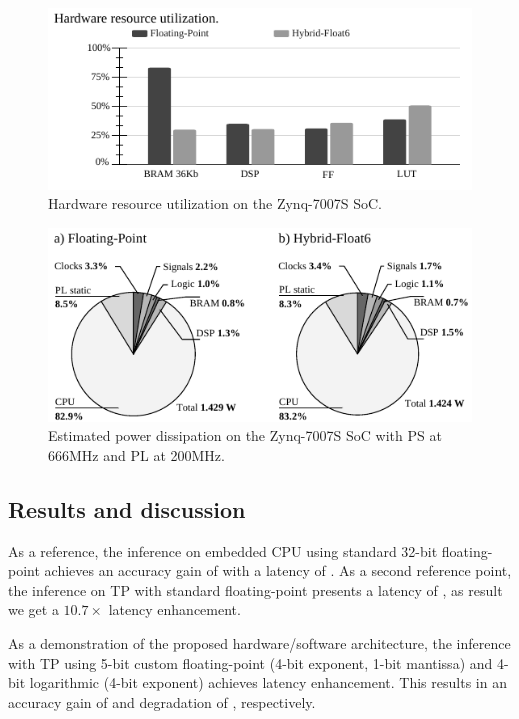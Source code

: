 \begin{figure}[t!]
	\centering
	\includegraphics[width=1\columnwidth]{../figures/power_breakdown/resource_utilization.pdf}
	\caption{Hardware resource utilization on the Zynq-7007S SoC.}
	\label{fig:resource_utilization}
\end{figure}

\begin{figure}[t!]
	\centering
	\includegraphics[width=1\columnwidth]{../figures/power_breakdown/power_breakdown.pdf}
	\caption{Estimated power dissipation on the Zynq-7007S SoC with PS at 666MHz and PL at 200MHz.}
	\label{fig:power}
\end{figure}

\subsection{Results and discussion}
As a reference, the inference on embedded CPU using standard 32-bit floating-point achieves an accuracy gain of  with a latency of . As a second reference point, the inference on TP with standard floating-point presents a latency of , as result we get a $10.7\times$ latency enhancement.

As a demonstration of the proposed hardware/software architecture, the inference with TP using 5-bit custom floating-point (4-bit exponent, 1-bit mantissa) and 4-bit logarithmic (4-bit exponent) achieves \REVIEWR{$55.5\times$} latency enhancement. This results in an accuracy gain of  and degradation of , respectively.

